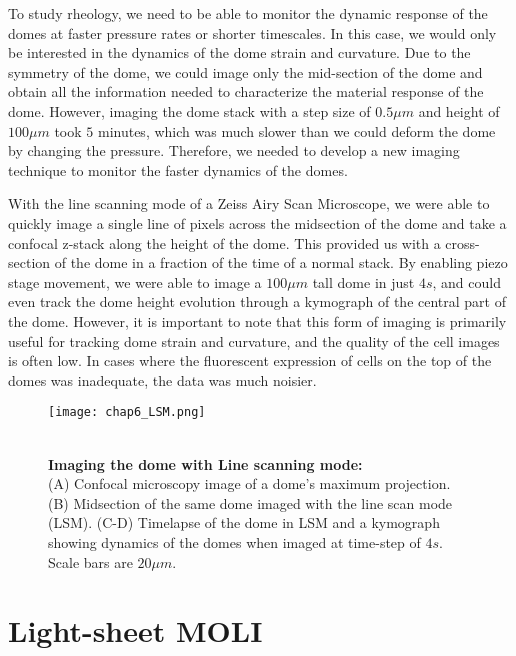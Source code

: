 To study rheology, we need to be able to monitor the dynamic response of
the domes at faster pressure rates or shorter timescales. In this case,
we would only be interested in the dynamics of the dome strain and
curvature. Due to the symmetry of the dome, we could image only the
mid-section of the dome and obtain all the information needed to
characterize the material response of the dome. However, imaging the
dome stack with a step size of \(0.5\mu m\) and height of \(100 \mu m\)
took \(5\) minutes, which was much slower than we could deform the dome
by changing the pressure. Therefore, we needed to develop a new imaging
technique to monitor the faster dynamics of the domes.

With the line scanning mode of a Zeiss Airy Scan Microscope, we were
able to quickly image a single line of pixels across the midsection of
the dome and take a confocal z-stack along the height of the dome. This
provided us with a cross-section of the dome in a fraction of the time
of a normal stack. By enabling piezo stage movement, we were able to
image a \(100\mu m\) tall dome in just \(4s\), and could even track the
dome height evolution through a kymograph of the central part of the
dome. However, it is important to note that this form of imaging is
primarily useful for tracking dome strain and curvature, and the quality
of the cell images is often low. In cases where the fluorescent
expression of cells on the top of the domes was inadequate, the data was
much noisier.

\begin{figure}
	\begin{minipage}[c]{0.6\textwidth}
		\texttt{[image: chap6\_LSM.png]}
	\end{minipage}\hfill
	\begin{minipage}[c]{0.35\textwidth}
		\caption{\\ \textbf{Imaging the dome with Line scanning mode:}\\ (A) Confocal microscopy image of a dome's maximum projection. (B) Midsection of the same dome imaged with the line scan mode (LSM). (C-D) Timelapse of the dome in LSM and a kymograph showing dynamics of the domes when imaged at time-step of $4s$. Scale bars are $20 \mu m$.
		} \label{fig_6_7}
	\end{minipage}
\end{figure}

\hypertarget{light-sheet-moli}{%
\section{Light-sheet MOLI}\label{light-sheet-moli}}


